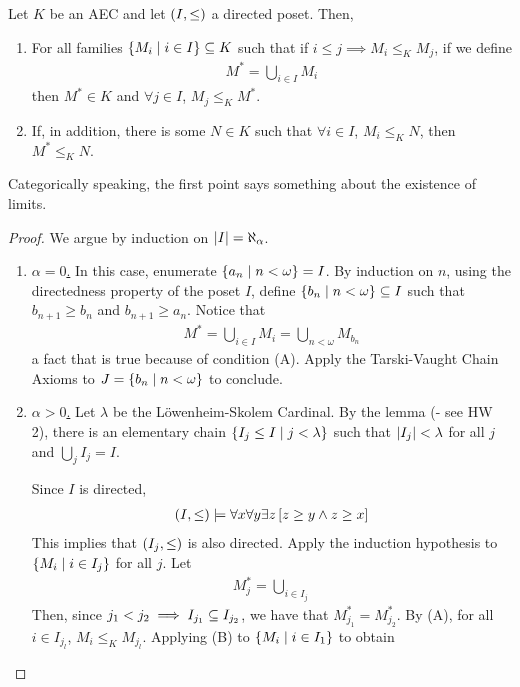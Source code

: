 \begin{boxtheorem}
    Let $K$ be an AEC and let $\left( I, \leq \right)$ a directed poset. Then,
    \begin{enumerate}[label = (\Alph*)]
        \item For all families $\left\{ M_i \; \middle\vert \; i \in I \right\} \subseteq K$ such that if $i \leq j \implies M_i \leq_K M_j$, if we define
        \begin{align*}
            M^* = \bigcup_{i \in I} M_i
        \end{align*}
        then $M^* \in K$ and $\forall j \in I$, $M_j \leq_K M^*$.

        \item If, in addition, there is some $N \in K$ such that $\forall i \in I$, $M_i \leq_K N$, then $M^* \leq_K N$.
    \end{enumerate}
    Categorically speaking, the first point says something about the existence of limits.
\end{boxtheorem}
\begin{proof}
    We argue by induction on $\left\lvert I \right\rvert = \aleph_{\alpha}$.

    \begin{enumerate}
        \item \underline{$\alpha = 0$.} In this case, enumerate $\left\{ a_n \; \middle\vert \; n < \omega \right\} = I$. By induction on $n$, using the directedness property of the poset $I$, define $\left\{ b_n \; \middle\vert \; n < \omega \right\} \subseteq I$ such that $b_{n+1} \geq b_n$ and $b_{n+1} \geq a_n$. Notice that
        \begin{align*}
            M^* = \bigcup_{i \in I} M_i = \bigcup_{n < \omega} M_{b_n}
        \end{align*}
        a fact that is true because of condition (A). Apply the Tarski-Vaught Chain Axioms to $J = \left\{ b_n \; \middle\vert \; n < \omega \right\}$ to conclude. %

        \item \underline{$\alpha > 0$.} Let $\lambda$ be the Löwenheim-Skolem Cardinal. By the lemma (\sorry - see HW 2), there is an elementary chain $\left\{ I_j \leq I \; \middle\vert \; j < \lambda \right\}$ such that $\left\lvert I_j \right\rvert < \lambda$ for all $j$ and $\bigcup_{j} I_j = I$.
        
        Since $I$ is directed,
        \begin{align*}
            \left( I, \leq \right) \models \forall x \forall y \exists z \left[ z \geq y \land z \geq x \right]
        \end{align*}
        This implies that $\left( I_j, \leq \right)$ is also directed. Apply the induction hypothesis to $\left\{ M_i \; \middle\vert \; i \in I_j \right\}$ for all $j$. Let
        \begin{align*}
            M_j^* = \bigcup_{i \in I_j}
        \end{align*}
        Then, since $j_1 < j_2 \implies I_{j_1} \subseteq I_{j_2}$, we have that $M_{j_1}^* = M_{j_2}^*$. By (A), for all $i \in I_{j_l}$, $M_i \leq_K M_{j_l}$. Applying (B) to $\left\{ M_i \; \middle\vert \; i \in I_1 \right\}$ to obtain \sorry
    \end{enumerate}
\end{proof}

